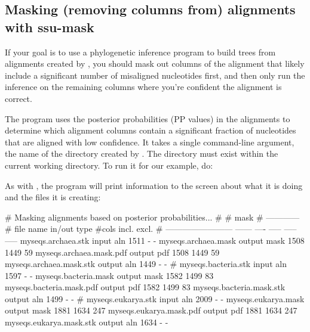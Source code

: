 \subsection{Masking (removing columns from) alignments with ssu-mask}
\label{sec:tutorial-masking}

If your goal is to use a phylogenetic inference program to build trees
from alignments created by , you should mask
out columns of the alignment that likely include a significant number
of misaligned nucleotides first, and then only run the inference on
the remaining columns where you're confident the alignment is correct. 

The  program uses the posterior probabilities
(PP values) in the alignments to determine which alignment columns
contain a significant fraction of nucleotides that are aligned with
low confidence. It takes a single command-line argument, the name of
the directory created by . The directory must exist
within the current working directory. To run it for our example, do: 


As with , the program will print information to the
screen about what it is doing and the files it is creating:

\begin{sreoutput}
# Masking alignments based on posterior probabilities...
#
#                                                    mask    
#                                                ------------
# file name                 in/out  type  #cols  incl.  excl.
# ------------------------  ------  ----  -----  -----  -----
  myseqs.archaea.stk         input   aln   1511      -      -
  myseqs.archaea.mask       output  mask   1508   1449     59
  myseqs.archaea.mask.pdf   output   pdf   1508   1449     59
  myseqs.archaea.mask.stk   output   aln   1449      -      -
#
  myseqs.bacteria.stk        input   aln   1597      -      -
  myseqs.bacteria.mask      output  mask   1582   1499     83
  myseqs.bacteria.mask.pdf  output   pdf   1582   1499     83
  myseqs.bacteria.mask.stk  output   aln   1499      -      -
#
  myseqs.eukarya.stk         input   aln   2009      -      -
  myseqs.eukarya.mask       output  mask   1881   1634    247
  myseqs.eukarya.mask.pdf   output   pdf   1881   1634    247
  myseqs.eukarya.mask.stk   output   aln   1634      -      -
\end{sreoutput}

